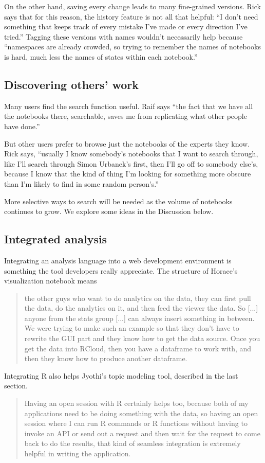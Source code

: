 On the other hand, saving every change leads to many fine-grained
versions. Rick says that for this reason, the history feature is not all that
helpful: ``I don't need something that keeps track of every mistake I've made or
every direction I've tried.'' Tagging these versions with names wouldn't
necessarily help because ``namespaces are already crowded, so trying to remember
the names of notebooks is hard, much less the names of states within each
notebook.''


\subsection{Discovering others' work}
Many users find the search function useful. Raif says ``the fact that we have
all the notebooks there, searchable, saves me from replicating what other people
have done.''

But other users prefer to browse just the notebooks of the experts they
know. Rick says, ``usually I know somebody's notebooks that I want to search
through, like I'll search through Simon Urbanek's first, then I'll go off to
somebody else's, because I know that the kind of thing I'm looking for something
more obscure than I'm likely to find in some random person's.''

More selective ways to search will be needed as the volume of notebooks
continues to grow. We explore some ideas in the Discussion below.

\subsection{Integrated analysis}
Integrating an analysis language into a web development environment is something
the tool developers really appreciate.  The structure of Horace's visualization
notebook means
\begin{quote}
the other guys who want to do analytics on the data, they can first pull the
data, do the analytics on it, and then feed the viewer the data. So [...]
anyone from the stats group [...] can always insert something in between. We
were trying to make such an example so that they don't have to rewrite the GUI
part and they know how to get the data source. Once you get the data into
RCloud, then you have a dataframe to work with, and then they know how to
produce another dataframe.
\end{quote}

Integrating R also helps Jyothi's topic modeling tool, described in the last section.
\begin{quote}
Having an open session with R certainly helps too, because both of my
applications need to be doing something with the data, so having an open session
where I can run R commands or R functions without having to invoke an API or
send out a request and then wait for the request to come back to do the results,
that kind of seamless integration is extremely helpful in writing the
application.
\end{quote}

